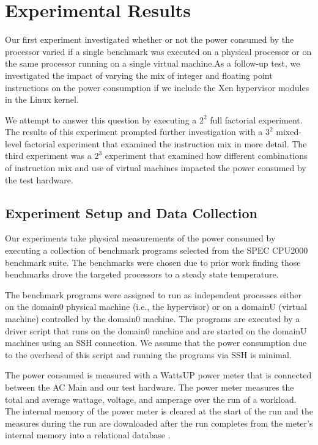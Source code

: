 \documentclass[preprint]{sigplanconf}
\begin{document}
\section{Experimental Results}
\label{sec:Results}
Our first experiment investigated whether or not the power consumed by the
processor varied if a single benchmark was executed on a physical processor or
on the same processor running on a single virtual machine.As a follow-up test, we investigated the impact of varying the mix of integer and floating point
instructions on the power consumption if we include the Xen
hypervisor modules in the Linux kernel.  

We attempt to answer this question by
executing a \(2^{2}\) full factorial experiment.  The results of this
experiment prompted further investigation with a \(3^{2}\) mixed-level
factorial experiment that examined the instruction mix in more detail. The
third experiment was a \(2^{3}\) experiment that examined how different
combinations of instruction mix and use of virtual machines impacted the power
consumed by the test hardware.

\subsection{Experiment Setup and Data Collection}
\label{sec:Setup}
Our experiments take physical measurements of the power consumed by executing
a collection of benchmark programs selected from the SPEC CPU2000
benchmark suite.   The benchmarks were
chosen due to prior work \cite{Donald2006} finding those benchmarks drove
the targeted processors to a steady state temperature.

The benchmark programs were assigned to run as independent processes either on
the domain0 physical machine (i.e., the hypervisor) or on a domainU (virtual
machine) controlled by the domain0 machine.   The programs are executed by a
driver script that runs on the domain0 machine and are started on the domainU
machines using an SSH connection.   We assume that the power consumption due
to the overhead of this script and running the programs via SSH is minimal.

The power consumed is measured with a WattsUP \cite{WattsUp2006a} power meter
that is connected between the AC Main and our test hardware.  The power meter
measures the total and average wattage, voltage, and amperage over the run of
a workload.  The internal memory of the power meter is cleared at the start of
the run and the measures during the run are downloaded after the run completes
from the meter's internal memory into a relational database
\cite{WattsUp2006b}.
\end{document}
